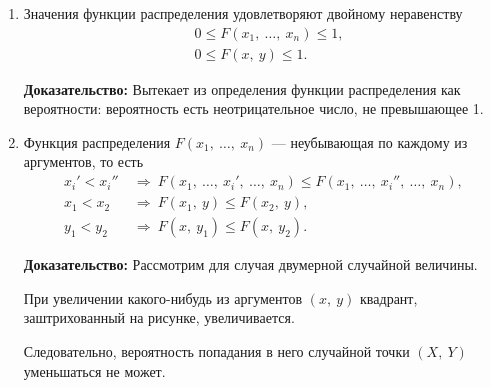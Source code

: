 \documentclass[a4paper]{article}
\makeatletter
\newcommand{\sleq}{\leqslant}
\renewcommand{\qedsymbol}{\ensuremath{\blacksquare}}
\newcommand{\qeddnostar}{\hfill{\color{Dark}\qedsymbol}}
\newcommand{\qeddstar}[1]{\hfill{\color{Dark}\raisebox{#1}{\qedsymbol}}}
\newcommand\qedd{\@ifstar\qeddstar\qeddnostar}
\newcommand{\prooff}{{\color{Dark}\bfseries Доказательство: \newline}}
\makeatother
\begin{document}
                    \begin{enumerate}
                        \item Значения функции распределения удовлетворяют двойному неравенству
                        \begin{equation*}
                            \begin{aligned}
                                & 0 \sleq F(x_1 , \: \ldots , \: x_n) \sleq 1 , \\[1.0ex]
                                & 0 \sleq F(x, \: y) \sleq 1 .
                            \end{aligned}
                        \end{equation*}

                        \prooff
                        Вытекает из определения функции распределения как вероятности: вероятность есть неотрицательное число, не превышающее 1. \qedd

                        \item Функция распределения $F(x_1 , \: \ldots , \: x_n)$ --- неубывающая по каждому из аргументов, то есть
                        \begin{equation*}
                            \begin{aligned}
                                x_i ' < x_i '' \: & \Rightarrow \: F(x_1 , \: \ldots , \:
                                    x_i ' , \: \ldots , \: x_n) \sleq F(x_1 , \: \ldots , \:
                                    x_i '' , \: \ldots , \: x_n) , \\[1.0ex]
                                x_1 < x_2 \: & \Rightarrow \: F(x_1 , \: y) \sleq
                                    F(x_2 , \: y) , \\[1.0ex]
                                y_1 < y_2 \: & \Rightarrow \: F(x , \: y_1) \sleq
                                    F(x , \: y_2) .
                            \end{aligned}
                        \end{equation*}

                        \prooff
                        Рассмотрим для случая двумерной случайной величины.
                        
                        При увеличении какого-нибудь из аргументов $(x, \: y)$ квадрант, заштрихованный на рисунке, увеличивается.
                        
                        Следовательно, вероятность попадания в него случайной точки $(X, \: Y)$ уменьшаться не может. \qedd


\end{enumerate}
\end{document}
